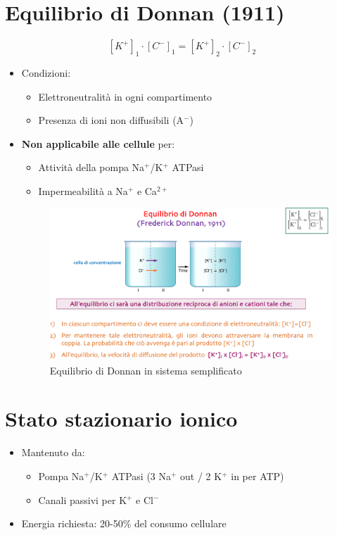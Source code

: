 \documentclass{article}
\begin{document}
\section{Equilibrio di Donnan (1911)}
\[
[K^+]_1 \cdot [C^-]_1 = [K^+]_2 \cdot [C^-]_2
\]
\begin{itemize}
\item Condizioni:
  \begin{itemize}
  \item Elettroneutralità in ogni compartimento
  \item Presenza di ioni non diffusibili (A\(^-\))
  \end{itemize}
\item \textbf{Non applicabile alle cellule} per:
  \begin{itemize}
  \item Attività della pompa Na\(^+\)/K\(^+\) ATPasi
  \item Impermeabilità a Na\(^+\) e Ca\(^{2+}\)
  \end{itemize}

\begin{figure}[h]
\centering
\includegraphics[width=1\textwidth]{Neuroscienze 2024-2025/Modulo I/Immagini Modulo I/Screenshot 2025-06-21 at 17-40-13 6. Differenza di potenziale e sua misurazione .pdf.png}
\caption{Equilibrio di Donnan in sistema semplificato}
\label{fig:donnan}
\end{figure}
\end{itemize}

\section{Stato stazionario ionico}
\begin{itemize}
\item Mantenuto da:
  \begin{itemize}
  \item Pompa Na\(^+\)/K\(^+\) ATPasi (3 Na\(^+\) out / 2 K\(^+\) in per ATP)
  \item Canali passivi per K\(^+\) e Cl\(^-\)
  \end{itemize}

\item Energia richiesta: 20-50\% del consumo cellulare
\end{itemize}
\end{document}
